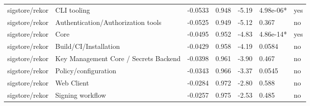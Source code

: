 \begin{table}[t]
\begin{tabular}{lllllll}
sigstore/rekor & CLI tooling & -0.0533 & 0.948 & -5.19 & 4.98e-06* & yes \\
sigstore/rekor & Authentication/Authorization tools & -0.0525 & 0.949 & -5.12 & 0.367 & no \\
sigstore/rekor & Core & -0.0495 & 0.952 & -4.83 & 4.86e-14* & yes \\
sigstore/rekor & Build/CI/Installation & -0.0429 & 0.958 & -4.19 & 0.0584 & no \\
sigstore/rekor & Key Management Core / Secrets Backend & -0.0398 & 0.961 & -3.90 & 0.467 & no \\
sigstore/rekor & Policy/configuration & -0.0343 & 0.966 & -3.37 & 0.0545 & no \\
sigstore/rekor & Web Client & -0.0284 & 0.972 & -2.80 & 0.588 & no \\
sigstore/rekor & Signing workflow & -0.0257 & 0.975 & -2.53 & 0.485 & no \\
\hline
\end{tabular}
\end{table}
